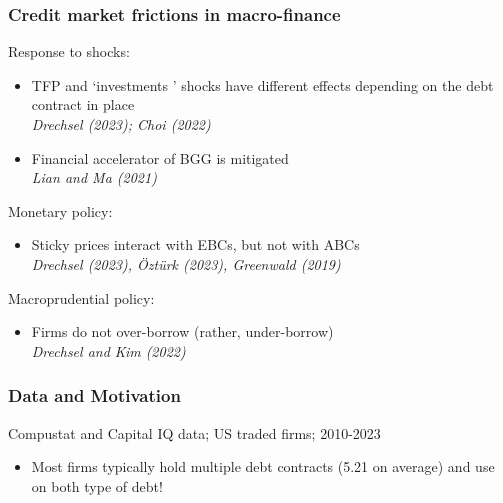 \documentclass[notes]{beamer}
\begin{document}
\begin{frame}[label=1] 
\frametitle{Credit market frictions in macro-finance}

Response to shocks: 
\begin{itemize}\setlength\itemsep{0em} \small
    \item  TFP and `investments ' shocks have different effects depending on the debt contract in place \\ \textit{Drechsel (2023); Choi (2022)}
    \item  Financial accelerator of BGG is mitigated \\ \textit{Lian and Ma (2021)}
\end{itemize} \normalsize

Monetary policy: 
\begin{itemize} \setlength\itemsep{0em} \small
    \item Sticky prices interact with EBCs, but not with ABCs \\ \textit{Drechsel (2023), Öztürk (2023), Greenwald (2019)}
\end{itemize} \normalsize

Macroprudential policy: 
\begin{itemize} \setlength\itemsep{0em} \small
    \item Firms do not over-borrow (rather, under-borrow) \\ \textit{Drechsel and Kim (2022)}
\end{itemize} \normalsize


\end{frame}

\begin{frame}[label=slide2] \frametitle{Data and Motivation}
Compustat and Capital IQ data; US traded firms; 2010-2023
\begin{itemize}  \setlength\itemsep{0em}
    \item Most firms typically hold multiple debt contracts (5.21 on average) and use on both type of debt!
\end{itemize} \vspace{0.1mm} \\
\begin{table}[h!]
\centering
{}
\label{tab:shares}
\end{table} 
\end{frame}
\end{document}
